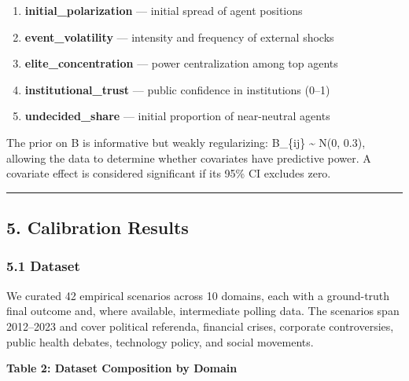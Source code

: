 \documentclass[
]{article}
\providecommand{\tightlist}{%
  \setlength{\itemsep}{0pt}\setlength{\parskip}{0pt}}
\begin{document}
\begin{enumerate}
\def\labelenumi{\arabic{enumi}.}
\tightlist
\item
  \textbf{initial\_polarization} --- initial spread of agent positions
\item
  \textbf{event\_volatility} --- intensity and frequency of external
  shocks
\item
  \textbf{elite\_concentration} --- power centralization among top
  agents
\item
  \textbf{institutional\_trust} --- public confidence in institutions
  (0--1)
\item
  \textbf{undecided\_share} --- initial proportion of near-neutral
  agents
\end{enumerate}

The prior on B is informative but weakly regularizing: B\_\{ij\}
\textasciitilde{} N(0, 0.3), allowing the data to determine whether
covariates have predictive power. A covariate effect is considered
significant if its 95\% CI excludes zero.

\begin{center}\rule{0.5\linewidth}{0.5pt}\end{center}

\subsection{5. Calibration Results}\label{calibration-results}

\subsubsection{5.1 Dataset}\label{dataset}

We curated 42 empirical scenarios across 10 domains, each with a
ground-truth final outcome and, where available, intermediate polling
data. The scenarios span 2012--2023 and cover political referenda,
financial crises, corporate controversies, public health debates,
technology policy, and social movements.

\textbf{Table 2: Dataset Composition by Domain}
\end{document}
